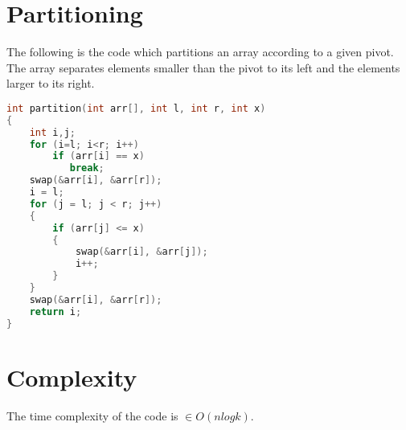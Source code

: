 \documentclass{article}
\begin{document}
\section{Partitioning}

The following is the code which partitions an array according to a given pivot. The array separates elements smaller than the pivot to its left and the elements larger to its right.

\begin{lstlisting}[language=c, caption=Partitioning]
int partition(int arr[], int l, int r, int x)
{
    int i,j;
    for (i=l; i<r; i++)
        if (arr[i] == x)
           break;
    swap(&arr[i], &arr[r]);
    i = l;
    for (j = l; j < r; j++)
    {
        if (arr[j] <= x)
        {
            swap(&arr[i], &arr[j]);
            i++;
        }
    }
    swap(&arr[i], &arr[r]);
    return i;
}
\end{lstlisting}

\section{Complexity}

The time complexity of the code is $\in O(n log k)$.
\end{document}
